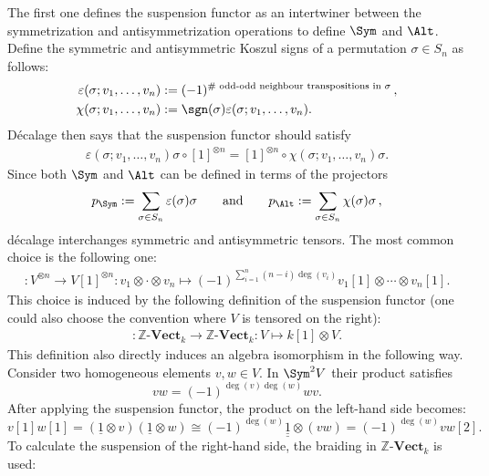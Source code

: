 \begin{remark}
        The first one defines the suspension functor as an intertwiner between the symmetrization and antisymmetrization operations to define $\Sym$ and $\Alt$. Define the symmetric and antisymmetric Koszul signs of a permutation $\sigma\in S_n$ as follows:
        \begin{align}
            \varepsilon(\sigma;v_1,\ldots,v_n) &:= (-1)^{\#\text{ odd-odd neighbour transpositions in }\sigma}\,,\\
            \chi(\sigma;v_1,\ldots,v_n) &:= \sgn(\sigma)\varepsilon(\sigma;v_1,\ldots,v_n).
        \end{align}
        D\'ecalage then says that the suspension functor should satisfy
        \begin{gather}
            \varepsilon(\sigma;v_1,\ldots,v_n)\sigma\circ[1]^{\otimes n} = [1]^{\otimes n}\circ\chi(\sigma;v_1,\ldots,v_n)\sigma.
        \end{gather}
        Since both $\Sym$ and $\Alt$ can be defined in terms of the projectors
        \begin{gather}
            p_{\Sym}:=\sum_{\sigma\in S_n}\varepsilon(\sigma)\sigma\qquad\text{and}\qquad p_{\Alt}:=\sum_{\sigma\in S_n}\chi(\sigma)\sigma\,,
        \end{gather}
        d\'ecalage interchanges symmetric and antisymmetric tensors. The most common choice is the following one:
        \begin{gather}
            [1]:V^{\otimes n}\rightarrow V[1]^{\otimes n}:v_1\otimes\cdot\otimes v_n\mapsto(-1)^{\sum_{i=1}^n(n-i)\deg(v_i)}v_1[1]\otimes\cdots\otimes v_n[1].
        \end{gather}
        This choice is induced by the following definition of the suspension functor (one could also choose the convention where $V$ is tensored on the right):
        \begin{gather}
            [1]:\mathbb{Z}\text{-}\mathbf{Vect}_k\rightarrow\mathbb{Z}\text{-}\mathbf{Vect}_k:V\mapsto k[1]\otimes V.
        \end{gather}
        This definition also directly induces an algebra isomorphism in the following way. Consider two homogeneous elements $v,w\in V$. In $\Sym^2V$ their product satisfies \[vw = (-1)^{\deg(v)\deg(w)}wv.\] After applying the suspension functor, the product on the left-hand side becomes: \[v[1]w[1]=(\underline{1}\otimes v)(\underline{1}\otimes w) \cong (-1)^{\deg(w)}\underline{\underline{1}}\otimes(vw)=(-1)^{\deg(w)}vw[2].\] To calculate the suspension of the right-hand side, the braiding in $\mathbb{Z}\text{-}\mathbf{Vect}_k$ is used:

\end{remark}
